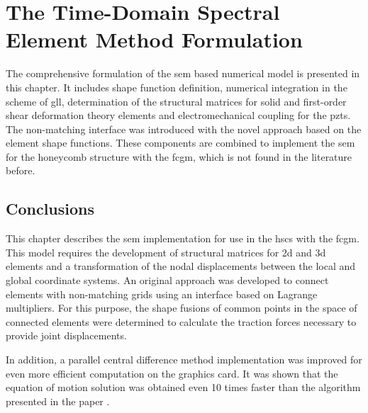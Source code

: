 
\chapter[The Time-Domain \acs{sem} Formulation]{The Time-Domain Spectral Element Method Formulation}
\label{ch:sem}
The comprehensive formulation of the \ac{sem} based numerical model is presented in this chapter.
It includes shape function definition, numerical integration in the scheme of \ac{gll}, determination of the structural matrices for solid and first-order shear deformation theory elements and electromechanical coupling for the \acp{pzt}.
The non-matching interface was introduced with the novel approach based on the element shape functions.
These components are combined to implement the \ac{sem} for the honeycomb structure with the \ac{fcgm}, which is not found in the literature before.











\section{Conclusions}
\label{sec:conclusionsSEM}
This chapter describes the \ac{sem} implementation for use in the \acp{hsc} with the \ac{fcgm}.
This model requires the development of structural matrices for \ac{2d} and \ac{3d} elements and a transformation of the nodal displacements between the local and global coordinate systems.
An original approach was developed to connect elements with non-matching grids using an interface based on Lagrange multipliers.
For this purpose, the shape fusions of common points in the space of connected elements were determined to calculate the traction forces necessary to provide joint displacements.

In addition, a parallel central difference method implementation was improved for even more efficient computation on the graphics card.
It was shown that the equation of motion solution was obtained even 10 times faster than the algorithm presented in the paper \cite{kudela2020parallel}.

